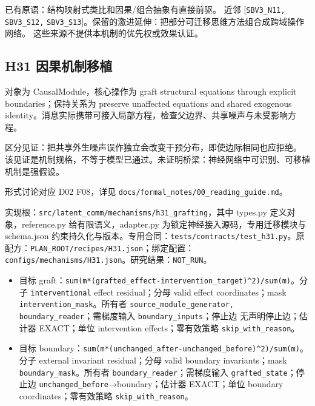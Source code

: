\documentclass[
  10pt,
]{article}
\begin{document}
已有原语：结构映射式类比和因果/组合抽象有直接前驱。 近邻
{[}\nolinkurl{SBV3_N11,} \nolinkurl{SBV3_S12,}
\nolinkurl{SBV3_S13}{]}。保留的激进延伸：把部分可迁移思维方法组合成跨域操作网络。
这些来源不提供本机制的优先权或效果认证。

\subsection{H31
因果机制移植}\label{h31-ux56e0ux679cux673aux5236ux79fbux690d}

对象为 CausalModule，核心操作为 graft structural equations through
explicit boundaries；保持关系为 preserve unaffected equations and shared
exogenous
identity。消息实际携带可接入局部方程，检查父边界、共享噪声与未受影响方程。

区分见证：把共享外生噪声误作独立会改变干预分布，即使边际相同也应拒绝。
该见证是机制规格，不等于模型已通过。未证明桥梁：神经网络中可识别、可移植机制是强假设。

形式讨论对应 D02 F08，详见
{\small\nolinkurl{docs/formal_notes/00_reading_guide.md}}。

实现根：{\small\nolinkurl{src/latent_comm/mechanisms/h31_grafting}}，其中
types.py 定义对象，reference.py 给有限语义，adapter.py
为锁定神经接入源码，专用迁移模块与 schema.json
约束持久化与版本。专用合同：{\small\nolinkurl{tests/contracts/test_h31.py}}。原配方：{\small\nolinkurl{PLAN_ROOT/recipes/H31.json}}；绑定配置：{\small\nolinkurl{configs/mechanisms/H31.json}}。研究结果：\nolinkurl{NOT_RUN}。

\begin{itemize}
\item
  目标
  graft：{\small\nolinkurl{sum(m*(grafted_effect-intervention_target)^2)/sum(m)}}。分子
  \nolinkurl{interventional} effect residual；分母 valid effect
  coordinates；mask \nolinkurl{intervention_mask}。所有者
  \nolinkurl{source_module_generator,}
  \nolinkurl{boundary_reader}；需梯度输入
  \nolinkurl{boundary_inputs}；停止边 无声明停止边；估计器 EXACT；单位
  intervention effects；零有效策略 \nolinkurl{skip_with_reason}。
\item
  目标
  boundary：{\small\nolinkurl{sum(m*(unchanged_after-unchanged_before)^2)/sum(m)}}。分子
  external invariant residual；分母 valid boundary invariants；mask
  \nolinkurl{boundary_mask}。所有者
  \nolinkurl{boundary_reader}；需梯度输入
  \nolinkurl{grafted_state}；停止边
  \nolinkurl{unchanged_before}→boundary；估计器 EXACT；单位 boundary
  coordinates；零有效策略 \nolinkurl{skip_with_reason}。
\end{itemize}
\end{document}
